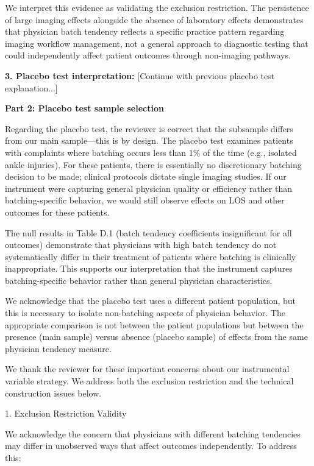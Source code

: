 \documentclass[11pt]{article}
\newcommand{\1}{\hbox{\rm 1\kern-.35em 1}}
\begin{document}
{We interpret this evidence as validating the exclusion restriction. The persistence of large imaging effects alongside the absence of laboratory effects demonstrates that physician batch tendency reflects a specific practice pattern regarding imaging workflow management, not a general approach to diagnostic testing that could independently affect patient outcomes through non-imaging pathways.

\textbf{3. Placebo test interpretation:}
[Continue with previous placebo test explanation...]
\color{black}

\textbf{Part 2: Placebo test sample selection}

Regarding the placebo test, the reviewer is correct that the subsample differs from our main sample—this is by design. The placebo test examines patients with complaints where batching occurs less than 1\% of the time (e.g., isolated ankle injuries). For these patients, there is essentially no discretionary batching decision to be made; clinical protocols dictate single imaging studies. If our instrument were capturing general physician quality or efficiency rather than batching-specific behavior, we would still observe effects on LOS and other outcomes for these patients.

The null results in Table D.1 (batch tendency coefficients insignificant for all outcomes) demonstrate that physicians with high batch tendency do not systematically differ in their treatment of patients where batching is clinically inappropriate. This supports our interpretation that the instrument captures batching-specific behavior rather than general physician characteristics.

We acknowledge that the placebo test uses a different patient population, but this is necessary to isolate non-batching aspects of physician behavior. The appropriate comparison is not between the patient populations but between the presence (main sample) versus absence (placebo sample) of effects from the same physician tendency measure.
\color{black}

\clearpage

We thank the reviewer for these important concerns about our instrumental variable strategy. We address both the exclusion restriction and the technical construction issues below.

1. Exclusion Restriction Validity

We acknowledge the concern that physicians with different batching tendencies may differ in unobserved ways that affect outcomes independently. To address this:

}
\end{document}
